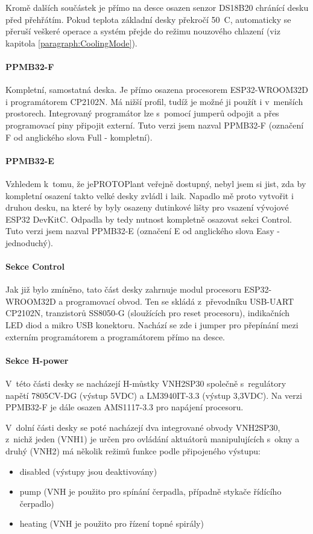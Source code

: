 Kromě dalších součástek je přímo na desce osazen senzor DS18B20 chránící desku před přehřátím. 
Pokud teplota základní desky překročí 50~\degree C, automaticky se přeruší veškeré operace a systém přejde do režimu nouzového chlazení (viz kapitola \ref{paragraph:CoolingMode}).

\paragraph{PPMB32-F}
Kompletní, samostatná deska. 
Je přímo osazena procesorem ESP32-WROOM32D i programátorem CP2102N. 
Má nižší profil, tudíž je možné ji použít i v~menších prostorech.
Integrovaný programátor lze s~pomocí jumperů odpojit a přes programovací piny připojit externí. Tuto verzi jsem nazval PPMB32-F (označení F od anglického slova Full - kompletní).

\paragraph{PPMB32-E}
Vzhledem k~tomu, že jePROTOPlant veřejně dostupný, nebyl jsem si jist, zda by kompletní osazení takto velké desky zvládl i laik. 
Napadlo mě proto vytvořit i druhou desku, na které by byly osazeny dutinkové lišty pro vsazení vývojové ESP32 DevKitC. 
Odpadla by tedy nutnost kompletně osazovat sekci Control. 
Tuto verzi jsem nazval PPMB32-E (označení E od anglického slova Easy - jednoduchý).

\paragraph{Sekce Control}
Jak již bylo zmíněno, tato část desky zahrnuje modul procesoru ESP32-WROOM32D a programovací obvod. 
Ten se skládá z~převodníku USB-UART CP2102N, tranzistorů SS8050-G (sloužících pro reset procesoru), indikačních LED diod a mikro USB konektoru. 
Nachází se zde i jumper pro přepínání mezi externím programátorem a programátorem přímo na desce.

\paragraph{Sekce H-power}
V~této části desky se nacházejí H-můstky VNH2SP30 společně s~regulátory napětí 7805CV-DG (výstup 5VDC) a LM3940IT-3.3 (výstup 3,3VDC). 
Na verzi PPMB32-F je dále osazen AMS1117-3.3 pro napájení procesoru. 

V~dolní části desky se poté nacházejí dva integrované obvody VNH2SP30, z~nichž jeden (VNH1) je určen pro ovládání aktuátorů manipulujících s~okny a druhý 
(VNH2) má několik režimů funkce podle připojeného výstupu:
\begin{itemize}
    \item disabled (výstupy jsou deaktivovány)
    \item pump (VNH je použito pro spínání čerpadla, případně stykače řídícího čerpadlo)
    \item heating (VNH je použito pro řízení topné spirály)
\end{itemize}

